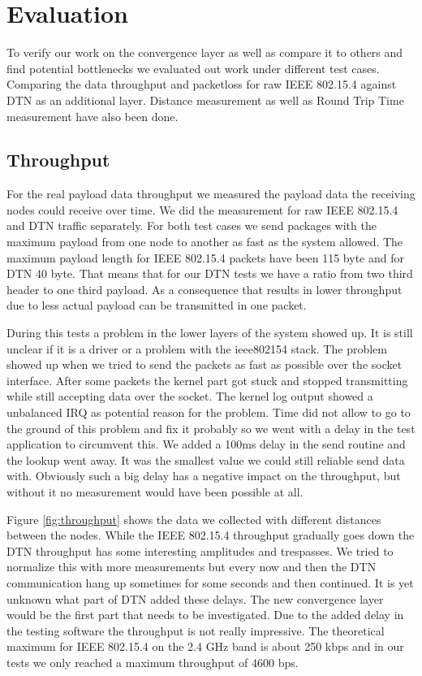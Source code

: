 \chapter{Evaluation}
To verify our work on the convergence layer as well as compare it to others and
find potential bottlenecks we evaluated out work under different test cases.
Comparing the data throughput and packetloss for raw IEEE 802.15.4 against DTN
as an additional layer. Distance measurement as well as Round Trip Time
measurement have also been done.

\section{Throughput}
For the real payload data throughput we measured the payload data the receiving
nodes could receive over time. We did the measurement for raw IEEE 802.15.4 and
DTN traffic separately. For both test cases we send packages with the maximum
payload from one node to another as fast as the system allowed. The maximum
payload length for IEEE 802.15.4 packets have been 115 byte and for DTN 40 byte.
That means that for our DTN tests we have a ratio from two third header to one
third payload. As a consequence that results in lower throughput due to less
actual payload can be transmitted in one packet.

During this tests a problem in the lower layers of the system showed up. It is
still unclear if it is a driver or a problem with the ieee802154 stack. The
problem showed up when we tried to send the packets as fast as possible over the
socket interface. After some packets the kernel part got stuck and stopped
transmitting while still accepting data over the socket. The kernel log output
showed a unbalanced IRQ as potential reason for the problem. Time did not allow
to go to the ground of this problem and fix it probably so we went with a delay
in the test application to circumvent this. We added a 100ms delay in the send
routine and the lookup went away. It was the smallest value we could still
reliable send data with. Obviously such a big delay has a negative impact on the
throughput, but without it no measurement would have been possible at all.

Figure \ref{fig:throughput} shows the data we collected with different distances between the
nodes. While the IEEE 802.15.4 throughput gradually goes down the DTN throughput
has some interesting amplitudes and trespasses. We tried to normalize this with
more measurements but every now and then the DTN communication hang up sometimes
for some seconds and then continued. It is yet unknown what part of DTN added
these delays. The new convergence layer would be the first part that needs to be
investigated. Due to the added delay in the testing software the throughput is
not really impressive. The theoretical maximum for IEEE 802.15.4 on the 2.4 GHz
band is about 250 kbps and in our tests we only reached a maximum throughput of
4600 bps.


